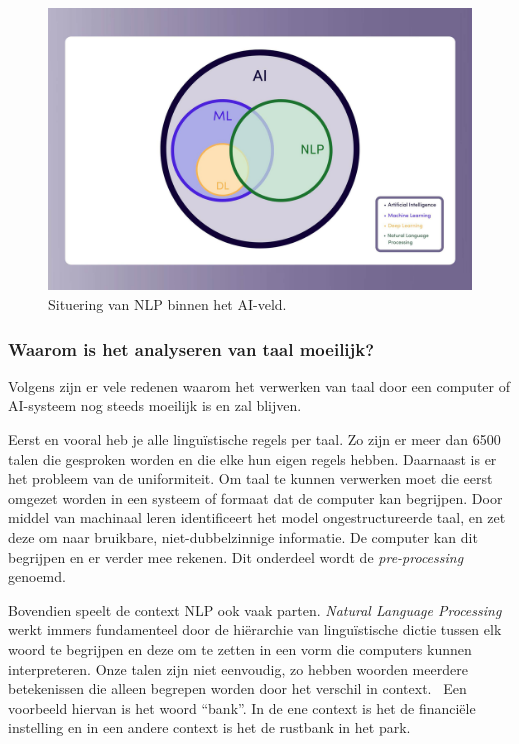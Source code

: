 {\begin{figure}
    \centering
    \includegraphics[width=.8\textwidth]{./img/nlp_field_ai.jpeg}
    \caption{\label{fig:nlp_field} Situering van NLP binnen het AI-veld.~\autocite{Kleinings2022}}
\end{figure}

\subsubsection{Waarom is het analyseren van taal moeilijk?}
Volgens \textcite{Kleinings2022} zijn er vele redenen waarom het verwerken van taal door een computer of AI-systeem nog steeds moeilijk is en zal blijven.

Eerst en vooral heb je alle linguïstische regels per taal. Zo zijn er meer dan 6500 talen die gesproken worden en die elke hun eigen regels hebben.
Daarnaast is er het probleem van de uniformiteit. Om taal te kunnen verwerken moet die eerst omgezet worden in een systeem of formaat dat de computer kan begrijpen. Door middel van machinaal leren identificeert het model ongestructureerde taal, en zet deze om naar bruikbare, niet-dubbelzinnige informatie. De computer kan dit begrijpen en er verder mee rekenen. Dit onderdeel wordt de \textit{pre-processing} genoemd.

Bovendien speelt de context NLP ook vaak parten. \textit{Natural Language Processing} werkt immers fundamenteel door de hiërarchie van linguïstische dictie tussen elk woord te begrijpen en deze om te zetten in een vorm die computers kunnen interpreteren. Onze talen zijn niet eenvoudig, zo hebben woorden meerdere betekenissen die alleen begrepen worden door het verschil in context.~\autocite{Kleinings2022} Een voorbeeld hiervan is het woord ``bank''. In de ene context is het de financiële instelling en in een andere context is het de rustbank in het park.

}
